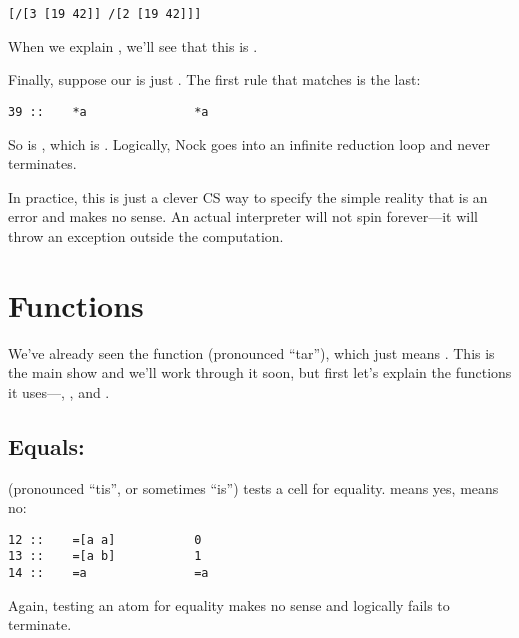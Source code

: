 \begin{framed_shaded}
\begin{Verbatim}[fontsize=\relsize{-2.5},fontseries=b,commandchars=\\\{\}]
[/[3 [19 42]] /[2 [19 42]]]
\end{Verbatim}
\end{framed_shaded}
When we explain \kode{/}, we'll see that this is \kode{[42 19]}.

Finally, suppose our  is just .  The first rule that
matches is the last:

\begin{framed_shaded}
\begin{Verbatim}[fontsize=\relsize{-2.5},fontseries=b,commandchars=\\\{\}]
39 ::    *a               *a
\end{Verbatim}
\end{framed_shaded}
So  is , which is .  Logically, Nock goes into
an infinite reduction loop and never terminates.

In practice, this is just a clever CS way to specify the simple
reality that  is an error and makes no sense.  An actual
interpreter will not spin forever---it will throw an exception
outside the computation.

\section{Functions}

We've already seen the \kode{*} function (pronounced ``tar''), which
just means .  This is the main show and we'll work through
it soon, but first let's explain the functions it uses---\kode{=}, ,
\kode{+} and \kode{/}.

\subsection{Equals: \kode{=}}

\kode{=} (pronounced ``tis'', or sometimes ``is'') tests a cell for
equality.   means yes,  means no:

\begin{framed_shaded}
\begin{Verbatim}[fontsize=\relsize{-2.5},fontseries=b,commandchars=\\\{\}]
12 ::    =[a a]           0
13 ::    =[a b]           1
14 ::    =a               =a
\end{Verbatim}
\end{framed_shaded}
Again, testing an atom for equality makes no sense and logically
fails to terminate.


